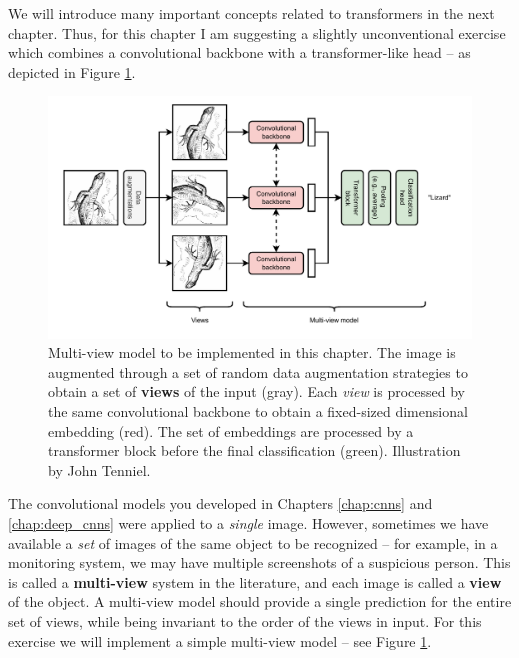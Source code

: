 We will introduce many important concepts related to transformers in the next chapter. Thus, for this chapter I am suggesting a slightly unconventional exercise which combines a convolutional backbone with a transformer-like head -- as depicted in Figure \ref{fig:multiview_model}.

\begin{figure}[t]
    \centering
    \hspace{1em}\includegraphics[width=1\textwidth]{images/Multiviewmodel}
    \caption{Multi-view model to be implemented in this chapter. The image is augmented through a set of random data augmentation strategies to obtain a set of \textbf{views} of the input (\colorbox{gray!30}{gray}). Each \textit{view} is processed by the same convolutional backbone to obtain a fixed-sized dimensional embedding (\colorbox{drawred!30}{red}). The set of embeddings are processed by a transformer block before the final classification (\colorbox{drawgreen!30}{green}). Illustration by John Tenniel.}
    \label{fig:multiview_model}
\end{figure}

The convolutional models you developed in Chapters \ref{chap:cnns} and \ref{chap:deep_cnns} were applied to a \textit{single} image. However, sometimes we have available a \textit{set} of images of the same object to be recognized -- for example, in a monitoring system, we may have multiple screenshots of a suspicious person. This is called a \textbf{multi-view} system in the literature, and each image is called a \textbf{view} of the object. A multi-view model should provide a single prediction for the entire set of views, while being invariant to the order of the views in input. For this exercise we will implement a simple multi-view model -- see Figure \ref{fig:multiview_model}.

